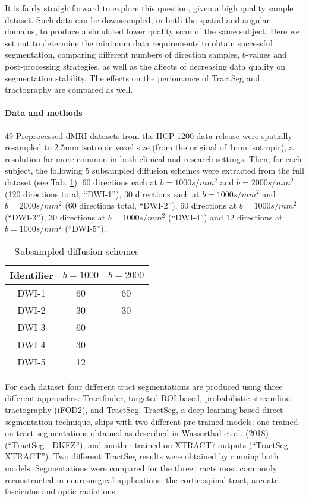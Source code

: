 It is fairly straightforward to explore this question, given a high quality sample dataset.
Such data can be downsampled, in both the spatial and angular domains, to produce a simulated lower quality scan of the same subject.
Here we set out to determine the minimum data requirements to obtain successful segmentation, comparing different numbers of direction samples, $b$-values and post-processing strategies, as well as the affects of decreasing data quality on segmentation stability.
The effects on the perfomance of TractSeg and tractography are compared as well.

\paragraph*{Data and methods}

49 Preprocessed dMRI datasets from the HCP 1200 data release were spatially resampled to 2.5mm isotropic voxel size (from the original of 1mm isotropic), a resolution far more common in both clinical and research settings.
Then, for each subject, the following 5 subsampled diffusion schemes were extracted from the full dataset (see Tab. \ref{tab:subschemes}):
60 directions each at $b=1000s/mm^2$ and $b=2000s/mm^2$ (120 directions total, ``DWI-1”), 30 directions each at $b=1000s/mm^2$ and $b=2000s/mm^2$ (60 directions total, ``DWI-2”), 60 directions at $b=1000s/mm^2$ (``DWI-3”), 30 directions at $b=1000s/mm^2$ (``DWI-4”) and 12 directions at $b=1000s/mm^2$ (``DWI-5”).

\begin{table}
  \centering
  \begin{tabular}{c c c} \toprule
    Identifier & $b = 1000$ & $b=2000$ \\
    \midrule
    DWI-1 & 60 & 60 \\
    DWI-2 & 30 & 30 \\
    DWI-3 & 60 &    \\
    DWI-4 & 30 &    \\
    DWI-5 & 12 &    \\ \bottomrule
  \end{tabular}
  \caption{Subsampled diffusion schemes}
  \label{tab:subschemes}
\end{table}

For each dataset four different tract segmentations are produced using three different approaches: Tractfinder, targeted ROI-based, probabilistic streamline tractography (iFOD2), and TractSeg.
TractSeg, a deep learning-based direct segmentation technique, ships with two different pre-trained models:
one trained on tract segmentations obtained as described in Wasserthal et al. (2018) (``TractSeg - DKFZ”), and another trained on XTRACT7 outputs (``TractSeg - XTRACT”).
Two different TractSeg results were obtained by running both models.
Segmentations were compared for the three tracts most commonly reconstructed in neurosurgical applications: the corticospinal tract, arcuate fasciculus and optic radiations.

